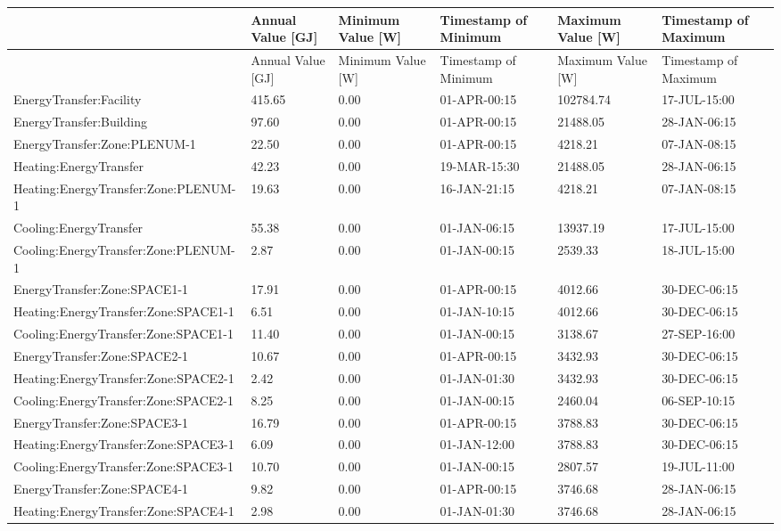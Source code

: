 {\scriptsize
\begin{longtable}[c]{>{\raggedright}p{1.0in}>{\raggedright}p{1.0in}>{\raggedright}p{1.0in}>{\raggedright}p{1.0in}>{\raggedright}p{1.0in}>{\raggedright}p{1.0in}}
\toprule
 & Annual Value [GJ] & Minimum Value [W] & Timestamp of Minimum & Maximum Value [W] & Timestamp of Maximum \tabularnewline
\midrule
\endfirsthead

\toprule
 & Annual Value [GJ] & Minimum Value [W] & Timestamp of Minimum & Maximum Value [W] & Timestamp of Maximum \tabularnewline
\midrule
\endhead

EnergyTransfer\-:Facility & 415.65 & 0.00 & 01-APR-00\-:15 & 102784.74 & 17-JUL-15\-:00 \tabularnewline
EnergyTransfer\-:Building & 97.60 & 0.00 & 01-APR-00\-:15 & 21488.05 & 28-JAN-06\-:15 \tabularnewline
EnergyTransfer\-:Zone\-:PLENUM-1 & 22.50 & 0.00 & 01-APR-00\-:15 & 4218.21 & 07-JAN-08\-:15 \tabularnewline
Heating\-:EnergyTransfer & 42.23 & 0.00 & 19-MAR-15\-:30 & 21488.05 & 28-JAN-06\-:15 \tabularnewline
Heating\-:EnergyTransfer\-:Zone\-:PLENUM-1 & 19.63 & 0.00 & 16-JAN-21\-:15 & 4218.21 & 07-JAN-08\-:15 \tabularnewline
Cooling\-:EnergyTransfer & 55.38 & 0.00 & 01-JAN-06\-:15 & 13937.19 & 17-JUL-15\-:00 \tabularnewline
Cooling\-:EnergyTransfer\-:Zone\-:PLENUM-1 & 2.87 & 0.00 & 01-JAN-00\-:15 & 2539.33 & 18-JUL-15\-:00 \tabularnewline
EnergyTransfer\-:Zone\-:SPACE1-1 & 17.91 & 0.00 & 01-APR-00\-:15 & 4012.66 & 30-DEC-06\-:15 \tabularnewline
Heating\-:EnergyTransfer\-:Zone\-:SPACE1-1 & 6.51 & 0.00 & 01-JAN-10\-:15 & 4012.66 & 30-DEC-06\-:15 \tabularnewline
Cooling\-:EnergyTransfer\-:Zone\-:SPACE1-1 & 11.40 & 0.00 & 01-JAN-00\-:15 & 3138.67 & 27-SEP-16\-:00 \tabularnewline
EnergyTransfer\-:Zone\-:SPACE2-1 & 10.67 & 0.00 & 01-APR-00\-:15 & 3432.93 & 30-DEC-06\-:15 \tabularnewline
Heating\-:EnergyTransfer\-:Zone\-:SPACE2-1 & 2.42 & 0.00 & 01-JAN-01\-:30 & 3432.93 & 30-DEC-06\-:15 \tabularnewline
Cooling\-:EnergyTransfer\-:Zone\-:SPACE2-1 & 8.25 & 0.00 & 01-JAN-00\-:15 & 2460.04 & 06-SEP-10\-:15 \tabularnewline
EnergyTransfer\-:Zone\-:SPACE3-1 & 16.79 & 0.00 & 01-APR-00\-:15 & 3788.83 & 30-DEC-06\-:15 \tabularnewline
Heating\-:EnergyTransfer\-:Zone\-:SPACE3-1 & 6.09 & 0.00 & 01-JAN-12\-:00 & 3788.83 & 30-DEC-06\-:15 \tabularnewline
Cooling\-:EnergyTransfer\-:Zone\-:SPACE3-1 & 10.70 & 0.00 & 01-JAN-00\-:15 & 2807.57 & 19-JUL-11\-:00 \tabularnewline
EnergyTransfer\-:Zone\-:SPACE4-1 & 9.82 & 0.00 & 01-APR-00\-:15 & 3746.68 & 28-JAN-06\-:15 \tabularnewline
Heating\-:EnergyTransfer\-:Zone\-:SPACE4-1 & 2.98 & 0.00 & 01-JAN-01\-:30 & 3746.68 & 28-JAN-06\-:15 \tabularnewline

\end{longtable}}
